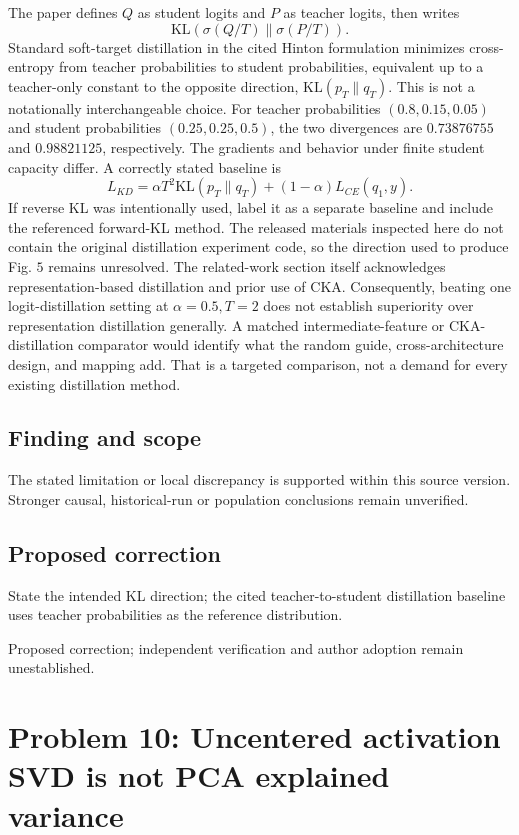 \documentclass[11pt]{article}
\begin{document}
The paper defines \(Q\) as student logits and \(P\) as teacher logits, then writes \[
\mathrm{KL}(\sigma(Q/T)\|\sigma(P/T)).
\] Standard soft-target distillation in the cited Hinton formulation minimizes cross-entropy from teacher probabilities to student probabilities, equivalent up to a teacher-only constant to the opposite direction, \(\mathrm{KL}(p_T\|q_T)\). This is not a notationally interchangeable choice. For teacher probabilities \((0.8,0.15,0.05)\) and student probabilities \((0.25,0.25,0.5)\), the two divergences are \(0.73876755\) and \(0.98821125\), respectively. The gradients and behavior under finite student capacity differ. A correctly stated baseline is \[
L_{KD}=\alpha T^2\mathrm{KL}(p_T\|q_T)
+(1-\alpha)L_{CE}(q_1,y).
\] If reverse KL was intentionally used, label it as a separate baseline and include the referenced forward-KL method. The released materials inspected here do not contain the original distillation experiment code, so the direction used to produce Fig. \(5\) remains unresolved. The related-work section itself acknowledges representation-based distillation and prior use of CKA. Consequently, beating one logit-distillation setting at \(\alpha=0.5,T=2\) does not establish superiority over representation distillation generally. A matched intermediate-feature or CKA-distillation comparator would identify what the random guide, cross-architecture design, and mapping add. That is a targeted comparison, not a demand for every existing distillation method.

\subsection*{Finding and scope}

The stated limitation or local discrepancy is supported within this source version. Stronger causal, historical-run or population conclusions remain unverified.

\subsection*{Proposed correction}

State the intended KL direction; the cited teacher-to-student distillation baseline uses teacher probabilities as the reference distribution.

Proposed correction; independent verification and author adoption remain unestablished.

\section*{Problem 10: Uncentered activation SVD is not PCA explained variance}
\end{document}
